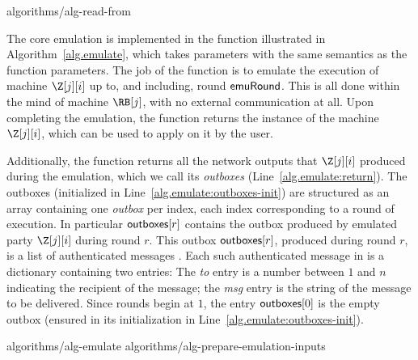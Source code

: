 {algorithms/alg-read-from}

The core emulation is implemented in the function \emulate illustrated in
Algorithm~\ref{alg.emulate}, which takes parameters with the same semantics as
the \emulationSnapshot function parameters. The job of the \emulate function
is to emulate the execution of machine $\Z[j][i]$ up to, and including, round
$\textsf{emuRound}$. This is all done within the mind of machine $\RB[j]$,
with no external communication at all. Upon completing the emulation,
the \emulate function returns the instance of the machine $\Z[j][i]$,
which can be used to apply \lread on it by the user.

Additionally, the
\emulate function returns all the network outputs that $\Z[j][i]$
produced during the emulation, which we call its \emph{outboxes}
(Line~\ref{alg.emulate:return}). The outboxes (initialized in
Line~\ref{alg.emulate:outboxes-init}) are structured as an array
containing one \emph{outbox} per index, each index corresponding to
a round of execution. In particular $\textsf{outboxes}[r]$ contains the
outbox produced by emulated party $\Z[j][i]$ during round $r$.
This outbox $\textsf{outboxes}[r]$, produced during round $r$, is a list
of authenticated messages \netouts. Each such authenticated
message \netout in \netouts is a dictionary containing two entries:
The \emph{to} entry is a number between $1$ and $n$
indicating the recipient of the message; the \emph{msg}
entry is the string of the message to be delivered.
Since rounds begin at $1$, the entry $\textsf{outboxes}[0]$ is the
empty outbox (ensured in its initialization in
Line~\ref{alg.emulate:outboxes-init}).

{algorithms/alg-emulate}
{algorithms/alg-prepare-emulation-inputs}

